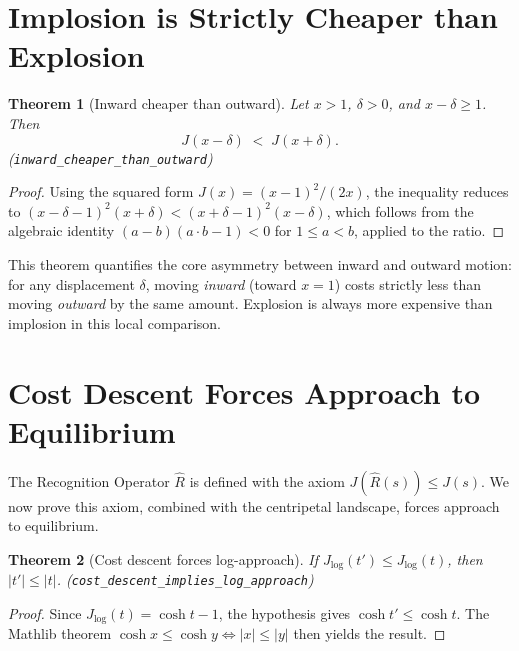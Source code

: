 \documentclass[11pt,a4paper]{article}
\newtheorem{theorem}{Theorem}[section]
\theoremstyle{definition}
\newcommand{\Jc}{J}
\newcommand{\Rhat}{\hat{R}}
\newcommand{\code}[1]{\texttt{\small #1}}
\begin{document}
\section{Implosion is Strictly Cheaper than Explosion}
\label{sec:cheaper}

\begin{theorem}[Inward cheaper than outward]\label{thm:cheaper}
Let $x > 1$, $\delta > 0$, and $x - \delta \ge 1$.  Then
\[
  \Jc(x - \delta) \;<\; \Jc(x + \delta).
\]
\textup{(\code{inward\_cheaper\_than\_outward})}
\end{theorem}

\begin{proof}
Using the squared form $\Jc(x)=(x-1)^2/(2x)$, the inequality reduces to
$(x-\delta-1)^2(x+\delta) < (x+\delta-1)^2(x-\delta)$, which follows from
the algebraic identity
$(a-b)(a\cdot b - 1) < 0$ for $1 \le a < b$, applied to the ratio.
\end{proof}

This theorem quantifies the core asymmetry between inward and outward motion:
for any displacement $\delta$, moving \emph{inward} (toward $x=1$) costs
strictly less than moving \emph{outward} by the same amount.  Explosion is
always more expensive than implosion in this local comparison.

\section{Cost Descent Forces Approach to Equilibrium}
\label{sec:approach}

The Recognition Operator $\Rhat$ is defined with the axiom
$\Jc(\Rhat(s)) \le \Jc(s)$.  We now prove this axiom, combined with the
centripetal landscape, forces approach to equilibrium.

\begin{theorem}[Cost descent forces log-approach]\label{thm:approach}
If $\Jc_{\log}(t') \le \Jc_{\log}(t)$, then $|t'| \le |t|$.
\textup{(\code{cost\_descent\_implies\_log\_approach})}
\end{theorem}

\begin{proof}
Since $\Jc_{\log}(t) = \cosh t - 1$, the hypothesis gives
$\cosh t' \le \cosh t$.  The Mathlib theorem
$\cosh x \le \cosh y \Leftrightarrow |x| \le |y|$ then yields the result.
\end{proof}
\end{document}
